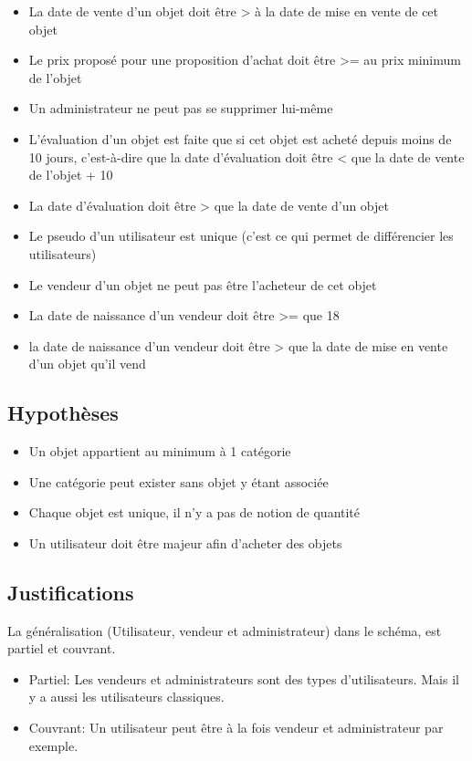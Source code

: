 \documentclass{article}
\begin{document}
\begin{itemize} [label=\textbullet]
	\item La date de vente d'un objet doit être > à la date de mise en vente de cet objet
	\item Le prix proposé pour une proposition d'achat doit être >= au prix minimum de l'objet
	\item Un administrateur ne peut pas se supprimer lui-même
	\item L'évaluation d'un objet est faite que si cet objet est acheté depuis moins de 10 jours, c'est-à-dire que la date d'évaluation doit être < que la date de vente de l'objet + 10
	\item La date d'évaluation doit être > que la date de vente d'un objet
	\item Le pseudo d'un utilisateur est unique (c'est ce qui permet de différencier les utilisateurs)
	\item Le vendeur d'un objet ne peut pas être l'acheteur de cet objet
	\item La date de naissance d'un vendeur doit être >= que 18
	\item la date de naissance d'un vendeur doit être > que la date de mise en vente d'un objet qu'il vend
	
\end{itemize}

\subsection{Hypothèses}

\begin{itemize}[label=\textbullet]
	\item Un objet appartient au minimum à 1 catégorie
	\item Une catégorie peut exister sans objet y étant associée
	\item Chaque objet est unique, il n'y a pas de notion de quantité
	\item Un utilisateur doit être majeur afin d'acheter des objets

\end{itemize}

\subsection{Justifications}
La généralisation (Utilisateur, vendeur et administrateur) dans le schéma, est partiel et couvrant.
\begin{itemize}

\item Partiel: Les vendeurs et administrateurs sont des types d'utilisateurs. Mais il y a aussi les utilisateurs classiques.

\item Couvrant: Un utilisateur peut être à la fois vendeur et administrateur par exemple.

\end{itemize}
\end{document}
